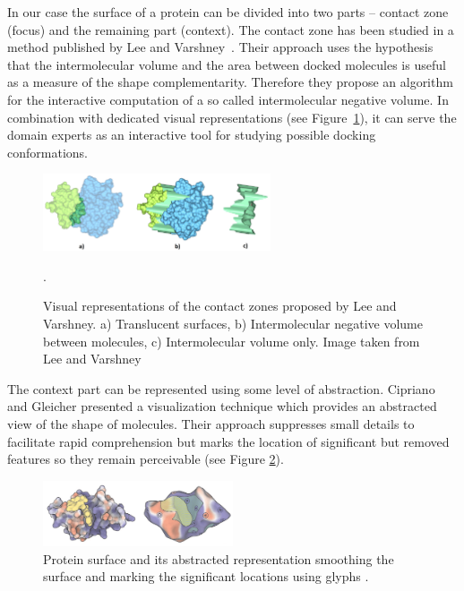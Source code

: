 \documentclass[11pt,a4paper,titlepage,oneside,onecolumn]{article}
\begin{document}
In our case the surface of a protein can be divided into two parts -- contact zone (focus) and the remaining part (context). 
The contact zone has been studied in a method published by Lee and Varshney~\cite{Lee2006}. 
Their approach uses the hypothesis that the intermolecular volume and the area between docked molecules is useful as a measure of the shape complementarity. 
Therefore they propose an algorithm for the interactive computation of a so called intermolecular negative volume. In combination with dedicated visual representations (see Figure~\ref{fig:varshney}), it can serve the domain experts as an interactive tool for studying possible docking conformations.

\begin{figure}[th]
  \centering
  \includegraphics[width=0.6\textwidth]{pics/varshney.png}
  \caption{Visual representations of the contact zones proposed by Lee and Varshney. a) Translucent surfaces, b) Intermolecular negative volume between molecules, c) Intermolecular volume only. Image taken from Lee and Varshney~\cite{Lee2006}}.
  \label{fig:varshney}
\end{figure}

The context part can be represented using some level of abstraction. Cipriano and Gleicher \cite{cipriano} presented a visualization technique which provides an abstracted view of the shape of molecules.
Their approach suppresses small details to facilitate rapid comprehension but marks the location of significant but removed features so they remain perceivable (see Figure \ref{cipriano}).

\begin{figure}[ht]
  \centering
  \includegraphics[width=0.5\textwidth]{pics/abstract.png}
  \caption{Protein surface and its abstracted representation smoothing the surface and marking the significant locations using glyphs \cite{cipriano}.}
  \label{cipriano}
\end{figure}
\end{document}
